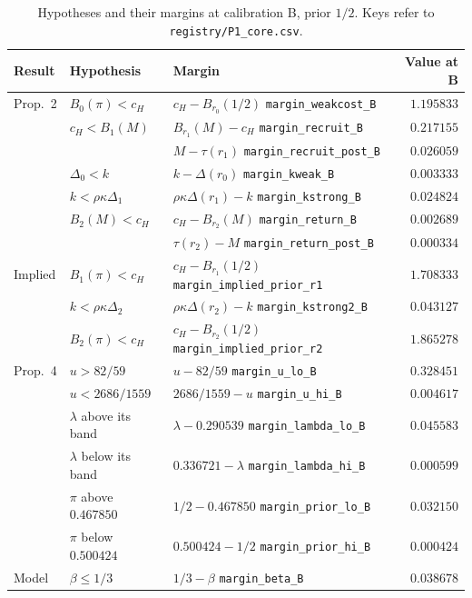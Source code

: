 \documentclass[11pt]{article}
\theoremstyle{definition}
\begin{document}
\begin{table}[h]
\centering
\caption{Hypotheses and their margins at calibration B, prior $1/2$. Keys refer to
\texttt{registry/P1\_core.csv}.}\label{tab:margins}
\small
\begin{tabular}{@{}lllr@{}}
\toprule
Result & Hypothesis & Margin & Value at B\\
\midrule
Prop.~2 & $B_0(\pi)<c_H$ & $c_H-B_{r_0}(1/2)$ \hfill\texttt{margin\_weakcost\_B} & $1.195833$\\
 & $c_H<B_1(M)$ & $B_{r_1}(M)-c_H$ \hfill\texttt{margin\_recruit\_B} & $0.217155$\\
 & & $M-\tau(r_1)$ \hfill\texttt{margin\_recruit\_post\_B} & $0.026059$\\
 & $\Delta_0<k$ & $k-\Delta(r_0)$ \hfill\texttt{margin\_kweak\_B} & $0.003333$\\
 & $k<\rho\kappa\Delta_1$ & $\rho\kappa\Delta(r_1)-k$ \hfill\texttt{margin\_kstrong\_B} & $0.024824$\\
 & $B_2(M)<c_H$ & $c_H-B_{r_2}(M)$ \hfill\texttt{margin\_return\_B} & $0.002689$\\
 & & $\tau(r_2)-M$ \hfill\texttt{margin\_return\_post\_B} & $0.000334$\\
\midrule
Implied & $B_1(\pi)<c_H$ & $c_H-B_{r_1}(1/2)$ \hfill\texttt{margin\_implied\_prior\_r1} & $1.708333$\\
 & $k<\rho\kappa\Delta_2$ & $\rho\kappa\Delta(r_2)-k$ \hfill\texttt{margin\_kstrong2\_B} & $0.043127$\\
 & $B_2(\pi)<c_H$ & $c_H-B_{r_2}(1/2)$ \hfill\texttt{margin\_implied\_prior\_r2} & $1.865278$\\
\midrule
Prop.~4 & $u>82/59$ & $u-82/59$ \hfill\texttt{margin\_u\_lo\_B} & $0.328451$\\
 & $u<2686/1559$ & $2686/1559-u$ \hfill\texttt{margin\_u\_hi\_B} & $0.004617$\\
 & $\lambda$ above its band & $\lambda-0.290539$ \hfill\texttt{margin\_lambda\_lo\_B} & $0.045583$\\
 & $\lambda$ below its band & $0.336721-\lambda$ \hfill\texttt{margin\_lambda\_hi\_B} & $0.000599$\\
 & $\pi$ above $0.467850$ & $1/2-0.467850$ \hfill\texttt{margin\_prior\_lo\_B} & $0.032150$\\
 & $\pi$ below $0.500424$ & $0.500424-1/2$ \hfill\texttt{margin\_prior\_hi\_B} & $0.000424$\\
Model & $\beta\le1/3$ & $1/3-\beta$ \hfill\texttt{margin\_beta\_B} & $0.038678$\\

\end{tabular}
\end{table}
\end{document}
